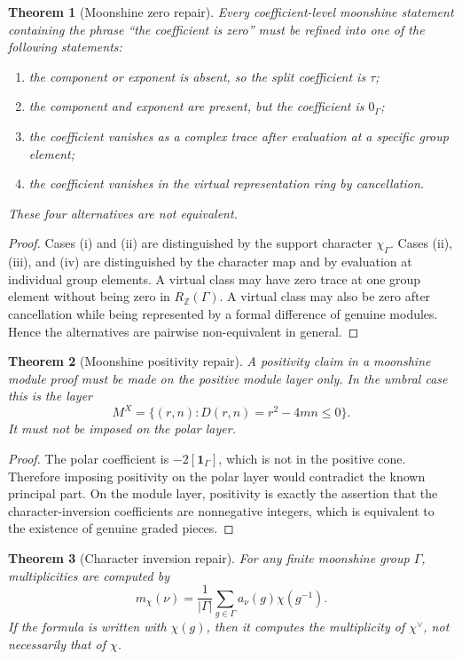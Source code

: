\documentclass[11pt]{article}
\newtheorem{theorem}{Theorem}[section]
\newcommand{\ZZ}{\mathbb Z}
\newcommand{\one}{\mathbf 1}
\begin{document}
\begin{theorem}[Moonshine zero repair]
Every coefficient-level moonshine statement containing the phrase ``the coefficient is zero'' must be refined into one of the following statements:
\begin{enumerate}[label=(\roman*)]
\item the component or exponent is absent, so the split coefficient is \(\tau\);
\item the component and exponent are present, but the coefficient is \(0_\Gamma\);
\item the coefficient vanishes as a complex trace after evaluation at a specific group element;
\item the coefficient vanishes in the virtual representation ring by cancellation.
\end{enumerate}
These four alternatives are not equivalent.
\end{theorem}

\begin{proof}
Cases (i) and (ii) are distinguished by the support character \(\chi_\Gamma\).  Cases (ii), (iii), and (iv) are distinguished by the character map and by evaluation at individual group elements.  A virtual class may have zero trace at one group element without being zero in \(R_\ZZ(\Gamma)\).  A virtual class may also be zero after cancellation while being represented by a formal difference of genuine modules.  Hence the alternatives are pairwise non-equivalent in general.
\end{proof}

\begin{theorem}[Moonshine positivity repair]
A positivity claim in a moonshine module proof must be made on the positive module layer only.  In the umbral case this is the layer
\[
M^X=\{(r,n):D(r,n)=r^2-4m n\le0\}.
\]
It must not be imposed on the polar layer.
\end{theorem}

\begin{proof}
The polar coefficient is \(-2[\one_\Gamma]\), which is not in the positive cone.  Therefore imposing positivity on the polar layer would contradict the known principal part.  On the module layer, positivity is exactly the assertion that the character-inversion coefficients are nonnegative integers, which is equivalent to the existence of genuine graded pieces.
\end{proof}

\begin{theorem}[Character inversion repair]
For any finite moonshine group \(\Gamma\), multiplicities are computed by
\[
m_\chi(\nu)=\frac1{|\Gamma|}\sum_{g\in\Gamma}a_\nu(g)\chi(g^{-1}).
\]
If the formula is written with \(\chi(g)\), then it computes the multiplicity of \(\chi^\vee\), not necessarily that of \(\chi\).
\end{theorem}
\end{document}
